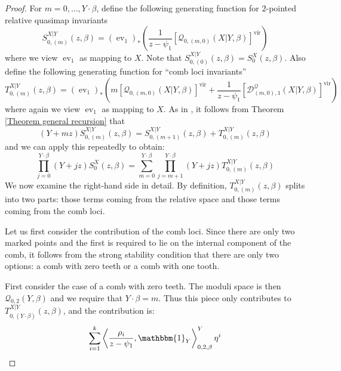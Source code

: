 \documentclass[11pt]{amsart}
\newcommand{\Q}[4]{\mathcal{Q}_{#1,#2}(#3,#4)}
\newcommand{\virt}[1]{[#1]^{\operatorname{vir}}}
\newcommand{\ev}{\operatorname{ev}}
\theoremstyle{definition}
\theoremstyle{definition}
\begin{document}
\begin{proof}
For $m = 0, \ldots, Y \cdot \beta$, define the following generating function for $2$-pointed relative quasimap invariants
 \[
  S_{0,(m)}^{X|Y}(z,\beta)=(\ev_1)_*\left(\frac{1}{z-\psi_1}\virt{\Q{0}{(m,0)}{X|Y}{\beta}}\right)
 \]
where we view $\ev_1$ as mapping to $X$.  Note that  $S_{0,(0)}^{X|Y}(z,\beta) = S_0^X(z, \beta)$. Also define the following generating function for ``comb loci invariants''
\[
 T_{0,(m)}^{X|Y}(z,\beta)=(\ev_1)_*\left(m \virt{\Q{0}{(m,0)}{X|Y}{\beta}}+\frac{1}{z-\psi_1} \virt{\mathcal{D}^{\mathcal{Q}}_{(m,0),1}(X|Y,\beta)} \right)
\]
where again we view $\ev_1$ as mapping to $X$. As in \cite[Lemma 1.2]{Ga-MF}, it follows from Theorem \ref{Theorem general recursion} that
\begin{equation}
 (Y+mz) S_{0,(m)}^{X|Y}(z,\beta) = S_{0,(m+1)}^{X|Y}(z,\beta)+ T_{0,(m)}^{X|Y}(z,\beta)
\end{equation}
and we can apply this repeatedly to obtain:
\begin{equation} \label{eqn:G}
\prod_{j=0}^{Y\cdot\beta}(Y+jz) S_0^X(z,\beta) = \sum_{m=0}^{Y\cdot\beta}\prod_{j=m+1}^{Y\cdot\beta}(Y+jz)T_{0,(m)}^{X|Y}(z,\beta)
\end{equation}
We now examine the right-hand side in detail. By definition, $T_{0,(m)}^{X|Y}(z,\beta)$ splits into two parts: those terms coming from the relative space and those terms coming from the comb loci.

Let us first consider the contribution of the comb loci. Since there are only two marked points and the first is required to lie on the internal component of the comb, it follows from the strong stability condition that there are only two options: a comb with zero teeth or a comb with one tooth.

First consider the case of a comb with zero teeth. The moduli space is then $\Q{0}{2}{Y}{\beta}$ and we require that $Y \cdot \beta = m$. Thus this piece only contributes to $T_{0,(Y\cdot\beta)}^{X|Y}(z,\beta)$, and the contribution is:
\begin{equation*} \sum_{i=1}^k \left\langle \dfrac{\rho_i}{z-\psi_1}, \mathbbm{1}_Y \right\rangle_{0,2,\beta}^Y \eta^i \end{equation*}


\end{proof}
\end{document}
